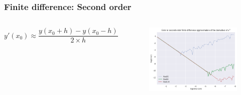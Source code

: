 \documentclass[hyperref={bookmarks=false},aspectratio=169]{beamer}
\begin{document}
\begin{frame}
  \frametitle{Finite difference: Second order}
  \begin{columns}
    \begin{equation*}
      y'(x_0)  \approx \frac{y(x_0 + h) - y(x_0 - h)}{2 \times h}
      \label{eq:d_second_order}
    \end{equation*}
    \begin{figure}[hbt!]
      \centering
      \includegraphics[width=\textwidth]{images/x^3_error_order2.png}


    \end{figure}

  \end{columns}
\end{frame}
\end{document}
